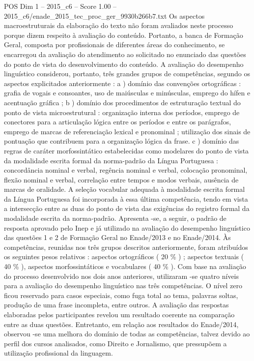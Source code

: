 \begin{textsample}{POS Dim 1 – 2015\_c6 – Score 1.00 – 2015\_c6/enade\_2015\_tec\_proc\_ger\_9930b266b7.txt}
Os aspectos macroestruturais da elaboração do texto não foram avaliados neste processo porque dizem respeito à avaliação do conteúdo.
Portanto, a banca de Formação Geral, composta por profissionais de diferentes áreas do conhecimento, se encarregou da avaliação do atendimento ao solicitado no enunciado das questões do ponto de vista do desenvolvimento do conteúdo.
A avaliação do desempenho linguístico considerou, portanto, três grandes grupos de competências, segundo os aspectos explicitados anteriormente : a ) domínio das convenções ortográficas : grafia de vogais e consoantes, uso de maiúsculas e minúsculas, emprego do hífen e acentuação gráfica ; b ) domínio dos procedimentos de estruturação textual do ponto de vista microestrutural : organização interna dos períodos, emprego de conectores para a articulação lógica entre os períodos e entre os parágrafos, emprego de marcas de referenciação lexical e pronominal ; utilização dos sinais de pontuação que contribuem para a organização lógica da frase. c ) domínio das regras de caráter morfossintático estabelecidas como modelares do ponto de vista da modalidade escrita formal da norma-padrão da Língua Portuguesa : concordância nominal e verbal, regência nominal e verbal, colocação pronominal, flexão nominal e verbal, correlação entre tempos e modos verbais, ausência de marcas de oralidade.
A seleção vocabular adequada à modalidade escrita formal da Língua Portuguesa foi incorporada à essa última competência, tendo em vista a intersecção entre as duas do ponto de vista das exigências do registro formal da modalidade escrita da norma-padrão.
Apresenta -se, a seguir, o padrão de resposta aprovado pelo Inep e já utilizado na avaliação do desempenho linguístico das questões 1 e 2 de Formação Geral no Enade/2013 e no Enade/2014.
Às competências, reunidas nos três grupos descritos anteriormente, foram atribuídos os seguintes pesos relativos : aspectos ortográficos ( 20 \% ) ; aspectos textuais ( 40 \% ), aspectos morfossintáticos e vocabulares ( 40 \% ).
Com base na avaliação do processo desenvolvido nos dois anos anteriores, utilizaram -se quatro níveis para a avaliação do desempenho linguístico nas três competências.
O nível zero ficou reservado para casos especiais, como fuga total ao tema, palavras soltas, produção de uma frase incompleta, entre outros.
A avaliação das respostas elaboradas pelos participantes revelou um resultado coerente na comparação entre as duas questões.
Entretanto, em relação aos resultados do Enade/2014, observou -se uma melhora do domínio de todas as competências, talvez devido ao perfil dos cursos analisados, como Direito e Jornalismo, que pressupõem a utilização profissional da linguagem.

\end{textsample}
